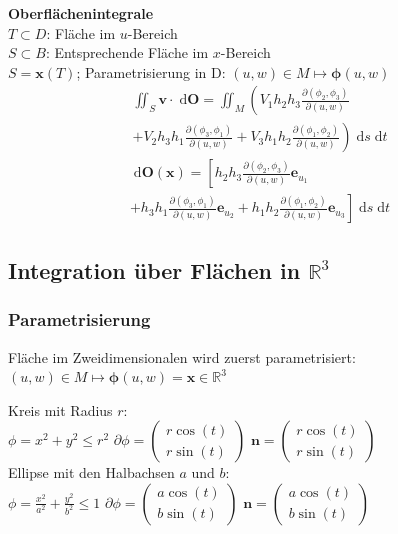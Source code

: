 \documentclass[6pt,a4paper]{scrartcl}
\newcommand{\vect}[1]{\ensuremath{\begin{pmatrix} #1 \end{pmatrix}}}                            %
\renewcommand{\vec}[1]{\ensuremath{\boldsymbol {#1}}}                                           %
\renewcommand{\emph}[1]{\textbf{#1}}                                                            %
\newcommand{\diff}{\ensuremath{\;\mathrm d}}                                   %
\newcommand{\R}{\ensuremath{\mathbb R}}
\begin{document}
\begin{multicols*}{4}
    \emph{Oberflächenintegrale}\\
    $T \subset D$: Fläche im $u$-Bereich\\
    $S \subset B$: Entsprechende Fläche im $x$-Bereich\\
    $S = \vec{x}(T)$; Parametrisierung in D: $(u,w) \in M \mapsto \vec{\phi}(u,w)$
    \begin{gather*}
        \iint_S{\vec{v} \cdot \diff\vec{O}} = \iint_M\left(V_1 h_2 h_3 \frac{\partial(\phi_2,\phi_3)}{\partial(u,w)}\right.\\ \left.+ V_2 h_3 h_1 \frac{\partial(\phi_3,\phi_1)}{\partial(u,w)} + V_3 h_1 h_2 \frac{\partial(\phi_1,\phi_2)}{\partial(u,w)}\right) \diff s \diff t
    \end{gather*}
    \begin{gather*}
        \diff\vec{O}(\vec{x}) = \left[h_2 h_3 \frac{\partial(\phi_2,\phi_3)}{\partial(u,w)}\vec{e}_{u_1}\right.\\ \left. + h_3 h_1 \frac{\partial(\phi_3,\phi_1)}{\partial(u,w)}\vec{e}_{u_2} + h_1 h_2 \frac{\partial(\phi_1,\phi_2)}{\partial(u,w)}\vec{e}_{u_3}\right] \diff s \diff t
    \end{gather*}

    \subsection{Integration über Flächen in $\R^3$}

    \subsubsection{Parametrisierung}
    Fläche im Zweidimensionalen wird zuerst parametrisiert:\\
    $(u,w) \in M \mapsto \vec{\phi}(u,w) = \vec{x} \in \R^3$

    Kreis mit Radius $r$:\\
    $\phi = x^2 + y^2 \le r^2$ \qquad $\partial \phi = \vect{r \cos(t)\\ r \sin(t)}$ \quad $\vec n = \vect{r \cos(t)\\ r \sin(t)}$\\[0.5em]
    Ellipse mit den Halbachsen $a$ und $b$:\\
    $\phi = \frac{x^2}{a^2} + \frac{y^2}{b^2} \le 1$ \qquad $\partial \phi = \vect{ a \cos(t) \\  b \sin(t)}$ \quad $\vec n = \vect{ a \cos(t) \\ b \sin(t)}$


\end{multicols*}
\end{document}
